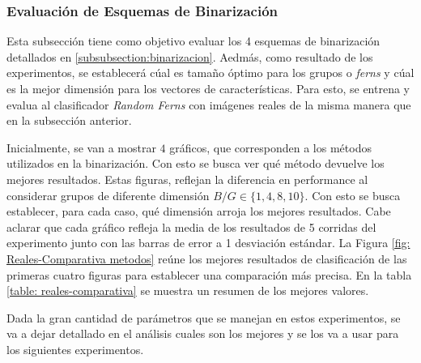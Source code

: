 \subsubsection{Evaluación de Esquemas de Binarización}
\label{subsubsection: eval_esquemas}


	Esta subsección tiene como objetivo evaluar los 4 esquemas de binarización detallados en \ref{subsubsection:binarizacion}. Aedmás, como resultado de los experimentos, se establecerá cúal es tamaño óptimo para los grupos o \textit{ferns} y cúal es la mejor dimensión para los vectores de características. Para esto, se entrena y evalua al clasificador \textit{Random Ferns} con imágenes reales de la misma manera que en la subsección anterior.
	
	Inicialmente, se van a mostrar $4$ gráficos, que corresponden a los métodos utilizados en la binarización. Con esto se busca ver qué método devuelve los mejores resultados. Estas figuras, reflejan la diferencia en performance al considerar grupos de diferente dimensión $B/G \in \{ 1, 4, 8, 10\}$. Con esto se busca establecer, para cada caso, qué dimensión arroja los mejores resultados. Cabe aclarar que cada gráfico refleja la media de los resultados de 5 corridas del experimento junto con las barras de error a 1 desviación estándar. La Figura \ref{fig: Reales-Comparativa metodos} reúne los mejores resultados de clasificación de las primeras cuatro figuras para establecer una comparación más precisa. En la tabla \ref{table: reales-comparativa} se muestra un resumen de los mejores valores.

	 Dada la gran cantidad de parámetros que se manejan en estos experimentos, se va a dejar detallado en el análisis cuales son los mejores y se los va a usar para los siguientes experimentos.

